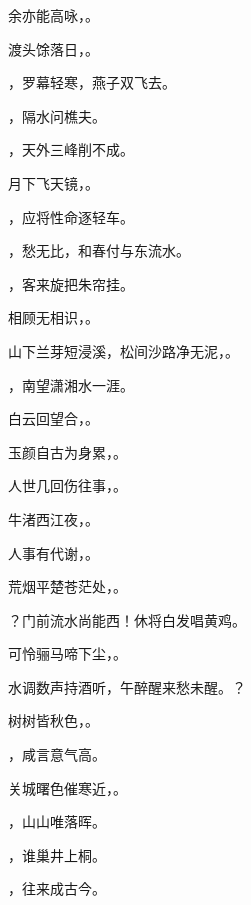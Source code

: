\documentclass[12pt, a4paper, addpoints]{exam}
\begin{document}
\begin{questions}
\question[1] 余亦能高咏，\uline{\qquad\qquad\qquad}。

\question[1] 渡头馀落日，\uline{\qquad\qquad\qquad}。

\question[1] \uline{\qquad\qquad\qquad}，罗幕轻寒，燕子双飞去。

\question[1] \uline{\qquad\qquad\qquad}，隔水问樵夫。

\question[1] \uline{\qquad\qquad\qquad}，天外三峰削不成。

\question[1] 月下飞天镜，\uline{\qquad\qquad\qquad}。

\question[1] \uline{\qquad\qquad\qquad}，应将性命逐轻车。

\question[1] \uline{\qquad\qquad\qquad}，愁无比，和春付与东流水。

\question[1] \uline{\qquad\qquad\qquad}，客来旋把朱帘挂。

\question[1] 相顾无相识，\uline{\qquad\qquad\qquad}。

\question[1] 山下兰芽短浸溪，松间沙路净无泥，\uline{\qquad\qquad\qquad}。

\question[1] \uline{\qquad\qquad\qquad}，南望潇湘水一涯。

\question[1] 白云回望合，\uline{\qquad\qquad\qquad}。

\question[1] 玉颜自古为身累，\uline{\qquad\qquad\qquad}。

\question[1] 人世几回伤往事，\uline{\qquad\qquad\qquad}。

\question[1] 牛渚西江夜，\uline{\qquad\qquad\qquad}。

\question[1] 人事有代谢，\uline{\qquad\qquad\qquad}。

\question[1] 荒烟平楚苍茫处，\uline{\qquad\qquad\qquad}。

\question[1] \uline{\qquad\qquad\qquad}？门前流水尚能西！休将白发唱黄鸡。

\question[1] 可怜骊马啼下尘，\uline{\qquad\qquad\qquad}。

\question[1] 水调数声持酒听，午醉醒来愁未醒。\uline{\qquad\qquad\qquad}？

\question[1] 树树皆秋色，\uline{\qquad\qquad\qquad}。

\question[1] \uline{\qquad\qquad\qquad}，咸言意气高。

\question[1] 关城曙色催寒近，\uline{\qquad\qquad\qquad}。

\question[1] \uline{\qquad\qquad\qquad}，山山唯落晖。

\question[1] \uline{\qquad\qquad\qquad}，谁巢井上桐。

\question[1] \uline{\qquad\qquad\qquad}，往来成古今。


\end{questions}
\end{document}
